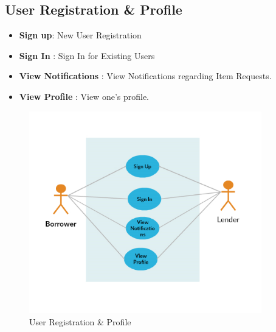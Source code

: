 \documentclass[a4paper]{article}
\begin{document}
\subsection{User Registration \& Profile}
\begin{itemize}
\item \textbf{Sign up}: New User Registration
\item \textbf{Sign In} : Sign In for Existing Users
\item \textbf{View Notifications} : View Notifications regarding Item Requests.
\item \textbf{View Profile} : View one's profile.
\end{itemize}
\begin{figure}[H] 
  \centering
  \includegraphics[width=0.9\textwidth]{usecase-Users.PNG}\hfill
  \caption{User Registration \& Profile}\label{Usecase-users}
\end{figure}
\end{document}
